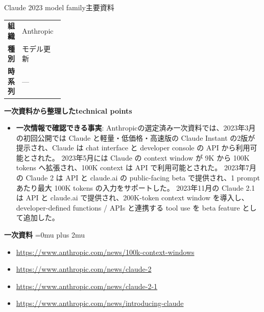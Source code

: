 \begin{technicalnote}{Claude 2023 model family}{主要資料}
\begingroup
\begin{tabularx}{\linewidth}{@{}>{\bfseries}p{0.22\linewidth}X@{}}
組織 & Anthropic \\
種別 & モデル更新 \\
時系列 & — \\
\end{tabularx}
\smallskip
{\bfseries 一次資料から整理したtechnical points}
\begin{itemize}[leftmargin=1.5em,itemsep=0.35em]
\item \textbf{一次情報で確認できる事実}: Anthropicの選定済み一次資料では、2023年3月の初回公開では Claude と軽量・低価格・高速版の Claude Instant の2版が提示され、Claude は chat interface と developer console の API から利用可能とされた。 2023年5月には Claude の context window が 9K から 100K tokens へ拡張され、100K context は API で利用可能とされた。 2023年7月の Claude 2 は API と claude.ai の public-facing beta で提供され、1 prompt あたり最大 100K tokens の入力をサポートした。 2023年11月の Claude 2.1 は API と claude.ai で提供され、200K-token context window を導入し、developer-defined functions / APIs と連携する tool use を beta feature として追加した。
\end{itemize}
\begin{minipage}{\linewidth}
\begin{samepage}
{\bfseries 一次資料}
\begingroup\sloppy
\Urlmuskip=0mu plus 2mu\relax
\begin{itemize}[leftmargin=1.5em,itemsep=0.25em]
\item {\scriptsize\url{https://www.anthropic.com/news/100k-context-windows}}
\item {\scriptsize\url{https://www.anthropic.com/news/claude-2}}
\item {\scriptsize\url{https://www.anthropic.com/news/claude-2-1}}
\item {\scriptsize\url{https://www.anthropic.com/news/introducing-claude}}
\end{itemize}
\endgroup
\end{samepage}
\end{minipage}
\endgroup
\end{technicalnote}
\medskip

